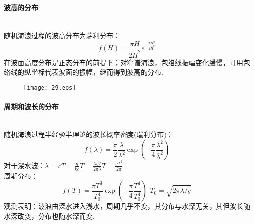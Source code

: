 \documentclass[a4paper,12pt]{article}
\begin{document}
    \paragraph{波高的分布}~{}\\
    随机海浪过程的波高分布为瑞利分布：
    \[
        f(H)=\frac{\pi H}{2\bar{H}^2}e^{-\frac{\pi H^2}{4\bar{H}^2}}
    \]
    在波面高度分布是正态分布的前提下；对窄谱海浪，包络线振幅变化缓慢，可用包络线的纵坐标代表波面的振幅，继而得到波高的分布.
    \begin{figure}[H]
        \centering\texttt{[image: 29.eps]}
        \caption*{}
    \end{figure}
    \paragraph{周期和波长的分布}~{}\\
    随机海浪过程半经验半理论的波长概率密度(瑞利分布)：
    \[
        f(\lambda)=\frac{\pi}{2} \frac{\lambda}{\lambda^{2}} \exp \left(-\frac{\pi}{4} \frac{\lambda^{2}}{\bar{\lambda}^{2}}\right)
    \]
    对于深水波：$\displaystyle \lambda=c T=\frac{g}{k c} T=\frac{\lambda g T}{2 \pi \lambda} T=\frac{g T^{2}}{2 \pi}$\\
    周期分布：
    \[
        f(T)=\frac{\pi T^{3}}{T_{0}^{4}} \exp \left(-\frac{\pi}{4} \frac{T^{4}}{T_{0}^{4}}\right),T_{0}=\sqrt{2 \pi \bar{\lambda} / g}
    \]
    观测表明：波浪由深水进入浅水，周期几乎不变，其分布与水深无关，其但波长随水深改变，分布也随水深而变.
    
	
\end{document}
